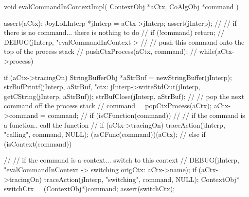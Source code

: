 \startCCode
void evalCommandInContextImpl(
  ContextObj *aCtx,
  CoAlgObj   *command
) {
  assert(aCtx);
  JoyLoLInterp *jInterp = aCtx->jInterp;
  assert(jInterp);
  //
  // if there is no command... there is nothing to do
  //
  if (!command) return;
  //
  DEBUG(jInterp, "evalCommandInContext > %
  //
  // push this command onto the top of the process stack
  //
  pushCtxProcess(aCtx, command);
  //
  while(aCtx->process) {
    if (aCtx->tracingOn) {
      StringBufferObj *aStrBuf = 
        newStringBuffer(jInterp);
      strBufPrintf(jInterp, aStrBuf, "\n ctx: %
      jInterp->writeStdOut(jInterp, getCString(jInterp, aStrBuf));
      strBufClose(jInterp, aStrBuf);
    }
    //
    // pop the next command off the process stack
    //
    command = popCtxProcess(aCtx);
    aCtx->command = command;
    //
    if (isCFunction(command)) {
      //
      // if the command is a function.. call the function
      //
      if (aCtx->tracingOn) 
        traceAction(jInterp, "calling", command, NULL);
      (asCFunc(command))(aCtx);
      //
    } else if (isContext(command)) {
      //
      // if the command is a context... switch to this context
      //
      DEBUG(jInterp, "evalCommandInContext -> switching origCtx: %
            aCtx->name);
      if (aCtx->tracingOn)
        traceAction(jInterp, "switching", command, NULL);
      ContextObj* switchCtx = (ContextObj*)command;
      assert(switchCtx);

}}}
